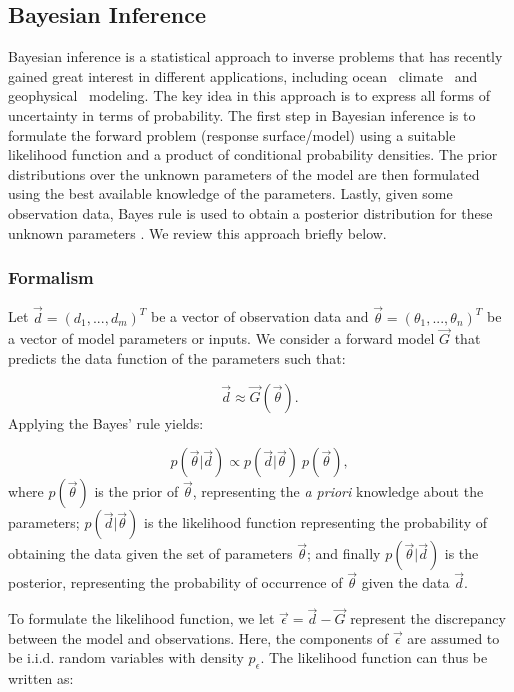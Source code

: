 \subsection{Bayesian Inference}
 \label{sec:inference}
 
Bayesian inference is a statistical approach to inverse problems
that has recently gained great interest in different applications, including
ocean~\citep{Alexanderian2011a,Zedler2012,sraj:2013a}
climate~\citep{OlsonEtAl2012} and geophysical~\citep{Malinverno2002} modeling.
The key idea in this approach is to express all forms of uncertainty
in terms of probability. The first step in Bayesian inference 
is to formulate the forward problem (response surface/model) using 
a suitable likelihood function and a product of conditional probability densities. 
The prior distributions over the unknown parameters of the model
are then formulated using the best available knowledge of the parameters.  Lastly, given some observation data, Bayes rule 
is used to obtain a posterior distribution for these unknown parameters
\citep{sivia}. We review this approach briefly below.
\subsubsection{Formalism}

Let $\vec{d}=(d_1,...,d_m)^T$ be a vector of observation data and $\vec{\theta}=(\theta_1,...,\theta_n)^T$ be a vector of model parameters or inputs. We consider a forward model $\vec G$ that predicts the data function of 
the parameters such that:

\begin{equation}
\vec d \approx \vec{G}( \vec \theta).
\end{equation}
Applying the Bayes' rule yields:

\begin{equation}
 p(\vec{\theta}| \vec d) \propto 
 p(\vec d | \vec{\theta}) \ p(\vec{\theta}), 
\label{eq:bayes}
\end{equation}
where $p(\vec{\theta})$ is the prior of $\vec{\theta}$, representing the \emph{a priori} knowledge
about the parameters; 
$p(\vec d| \vec{\theta})$ is the likelihood function representing
the probability of obtaining the data given the set of parameters $\vec{\theta}$;
and finally $p(\vec{\theta}| \vec d)$ is the posterior,
representing the probability of occurrence of $\vec{\theta}$ given the data $\vec d $.

To formulate the likelihood function, we let $\vec \epsilon = \vec d - \vec{G}$
represent the discrepancy between the model and observations.
Here, the components of $\vec \epsilon $ are assumed to be i.i.d. random variables with density $p_{\epsilon}$.
The likelihood function can thus be written as:

